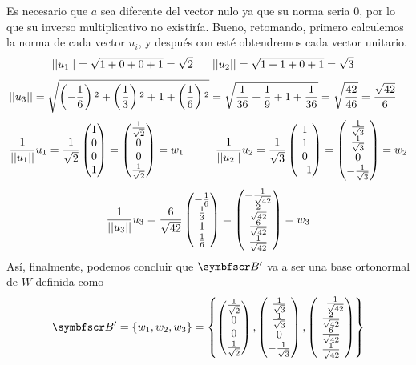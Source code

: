    Es necesario que \(a\) sea diferente del vector nulo ya que su norma seria 0, por lo que su inverso multiplicativo no existiría.
    Bueno, retomando, primero calculemos la norma de cada vector \(u_i\), y después con esté obtendremos cada vector unitario.
    \[
        \begin{aligned}
            \left|\left|u_1\right|\right| &= \sqrt{1 + 0 + 0 + 1} = \sqrt{2}
        \end{aligned}
        \hspace{0.25cm}
        \begin{aligned}
            \left|\left|u_2\right|\right| &= \sqrt{1 + 1 + 0 + 1} = \sqrt{3}
        \end{aligned}
    \]
    \[
        \begin{aligned}
            \left|\left|u_3\right|\right| &= 
                \sqrt{
                    \left(-\frac{1}{6}\right){}^2
                    +
                    \left(\frac{1}{3}\right){}^2
                    +
                    1
                    +
                    \left(\frac{1}{6}\right){}^2
                } 
            =
            \sqrt{
                \frac{1}{36}
                +
                \frac{1}{9}
                +
                1
                +
                \frac{1}{36}
            }
            = 
            \sqrt{
                \frac{42}{46}
            }
            =
            \frac{\sqrt{42}}{6}
        \end{aligned}
    \]
    \[
        \frac{1}{\fnorm{u_1}}u_1 
        = 
        \frac{1}{\sqrt{2}}
        \fvec{1,0,0,1}
        =
        \fvec{
            \frac{1}{\sqrt{2}},
            0,
            0,
            \frac{1}{\sqrt{2}}
        }
        =
        w_1
        \hspace{1cm}
        \frac{1}{\fnorm{u_2}}u_2
        =
        \frac{1}{\sqrt{3}}
        \fvec{1,1,0,-1}
        =
        \fvec{
            \frac{1}{\sqrt{3}},
            \frac{1}{\sqrt{3}},
            0,
            -\frac{1}{\sqrt{3}}
        }
        =
        w_2
    \]
    \[
        \frac{1}{\fnorm{u_3}}u_3
        =
        \frac{6}{\sqrt{42}}
        \fvec{
            -\frac{1}{6},
            \frac{1}{3},
            1,
            \frac{1}{6}
        }
        =
        \fvec{
            -\frac{1}{\sqrt{42}},
            \frac{2}{\sqrt{42}},
            \frac{6}{\sqrt{42}},
            \frac{1}{\sqrt{42}}
        }
        =
        w_3
    \]
    Así, finalmente, podemos concluir que \(\fb'\) va a ser una base ortonormal de \(W\) definida como
    \[
        \fb' = \fset{w_1, w_2, w_3} = 
        \fset{
            \fvec{
                \frac{1}{\sqrt{2}},
                0,
                0,
                \frac{1}{\sqrt{2}}
            },
            \fvec{
                \frac{1}{\sqrt{3}},
                \frac{1}{\sqrt{3}},
                0,
                -\frac{1}{\sqrt{3}}
            },
            \fvec{
                -\frac{1}{\sqrt{42}},
                \frac{2}{\sqrt{42}},
                \frac{6}{\sqrt{42}},
                \frac{1}{\sqrt{42}}
            }
        }
    \]
